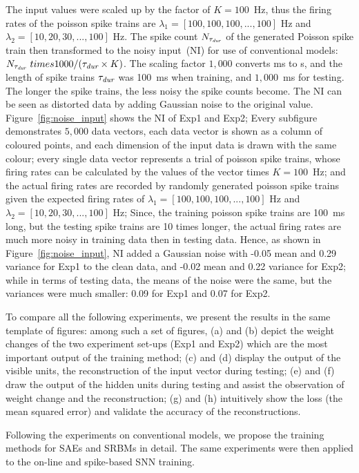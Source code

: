 The input values were scaled up by the factor of $K = 100$~Hz, thus the firing rates of the poisson spike trains are $\lambda_1 = [100, 100, 100, ..., 100]$ Hz and $\lambda_2 = [10, 20, 30, ..., 100]$ Hz.
The spike count $N_{\tau_{\textit{\textrm{dur}}}}$ of the generated Poisson spike train then transformed to the noisy input~(NI) for use of conventional models: $N_{\tau_{\textit{\textrm{dur}}}}\ times 1000/(\tau_{\textit{\textrm{dur}}} \times K)$.
The scaling factor $1,000$ converts ms to s, and the length of spike trains $\tau_{\textit{\textrm{dur}}}$ was 100~ms when training, and $1,000$~ms for testing.
The longer the spike trains, the less noisy the spike counts become.
The NI can be seen as distorted data by adding Gaussian noise to the original value.
Figure~\ref{fig:noise_input} shows the NI of Exp1 and Exp2; Every subfigure demonstrates $5,000$ data vectors, each data vector is shown as a column of coloured points, and each dimension of the input data is drawn with the same colour;
every single data vector represents a trial of poisson spike trains, whose firing rates can be calculated by the values of the vector times $K = 100$~Hz;
and the actual firing rates are recorded by randomly generated poisson spike trains given the expected firing rates of $\lambda_1 = [100, 100, 100, ..., 100]$ Hz and $\lambda_2 = [10, 20, 30, ..., 100]$ Hz;
Since, the training poisson spike trains are 100~ms long, but the testing spike trains are 10 times longer, the actual firing rates are much more noisy in training data then in testing data.
Hence, as shown in Figure~\ref{fig:noise_input}, NI added a Gaussian noise with -0.05 mean and 0.29 variance for Exp1 to the clean data, and -0.02 mean and 0.22 variance for Exp2;
while in terms of testing data, the means of the noise were the same, but the variances were much smaller: 0.09 for Exp1 and 0.07 for Exp2.


To compare all the following experiments, we present the results in the same template of figures:
among such a set of figures, (a) and (b) depict the weight changes of the two experiment set-ups (Exp1 and Exp2) which are the most important output of the training method;
(c) and (d) display the output of the visible units, the reconstruction of the input vector during testing;
(e) and (f) draw the output of the hidden units during testing and assist the observation of weight change and the reconstruction;
(g) and (h) intuitively show the loss (the mean squared error) and validate the accuracy of the reconstructions.

Following the experiments on conventional models, we propose the training methods for SAEs and SRBMs in detail.
The same experiments were then applied to the on-line and spike-based SNN training.

